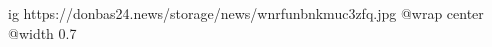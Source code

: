  
 
 
 
 

\ifcmt
  ig https://donbas24.news/storage/news/wnrfunbnkmuc3zfq.jpg
  @wrap center
  @width 0.7
\fi
